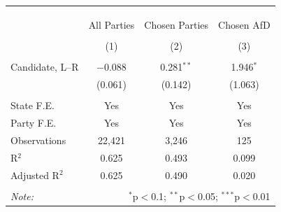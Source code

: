 
\begin{table}[!htbp] \centering 
  \caption{} 
  \label{} 
\begin{tabular}{@{\extracolsep{5pt}}lccc} 
\\[-1.8ex]\hline 
\hline \\[-1.8ex] 
\\[-1.8ex] & \multicolumn{3}{c}{} \\ 
 & All Parties & Chosen Parties & Chosen AfD \\ 
\\[-1.8ex] & (1) & (2) & (3)\\ 
\hline \\[-1.8ex] 
 Candidate, L--R & $-$0.088 & 0.281$^{**}$ & 1.946$^{*}$ \\ 
  & (0.061) & (0.142) & (1.063) \\ 
 \hline \\[-1.8ex] 
State F.E. & Yes & Yes & Yes \\ 
Party F.E. & Yes & Yes & Yes \\ 
Observations & 22,421 & 3,246 & 125 \\ 
R$^{2}$ & 0.625 & 0.493 & 0.099 \\ 
Adjusted R$^{2}$ & 0.625 & 0.490 & 0.020 \\ 
\hline 
\hline \\[-1.8ex] 
\textit{Note:}  & \multicolumn{3}{r}{$^{*}$p$<$0.1; $^{**}$p$<$0.05; $^{***}$p$<$0.01} \\ 
\end{tabular} 
\end{table} 
